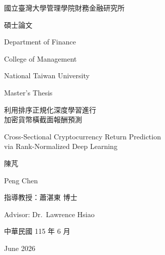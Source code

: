 \documentclass[12pt, a4paper, oneside]{ctexbook}
\begin{document}
\frontmatter

\begin{titlepage}
\begin{singlespace}
\centering
\vspace*{1cm}

{\fontsize{18}{27}\selectfont 國立臺灣大學管理學院財務金融研究所\par
                               碩士論文\par}
{\fontsize{14}{21}\selectfont Department of Finance\par
                               College of Management\par}
{\fontsize{16}{24}\selectfont National Taiwan University\par
                               Master's Thesis\par}

\vfill

{\fontsize{18}{27}\selectfont 利用排序正規化深度學習進行\\
                               加密貨幣橫截面報酬預測\par}
\vspace{6pt}
{\fontsize{18}{27}\selectfont Cross-Sectional Cryptocurrency Return Prediction\\
                               via Rank-Normalized Deep Learning\par}

\vfill

{\fontsize{18}{27}\selectfont 陳\quad 芃\par
                               Peng Chen\par}

\vfill

{\fontsize{18}{27}\selectfont 指導教授：蕭湛東 博士\par
                               Advisor: Dr.\ Lawrence Hsiao\par}

\vfill

{\fontsize{18}{27}\selectfont 中華民國 115 年 6 月\par
                               June 2026\par}

\vspace{3cm}
\end{singlespace}
\end{titlepage}
\end{document}
